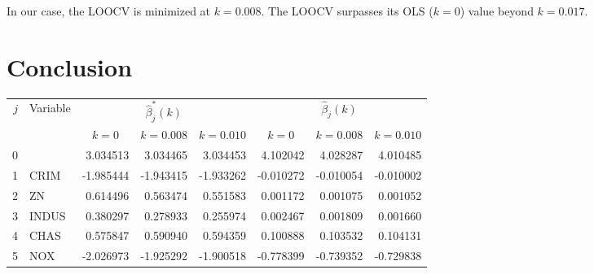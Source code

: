 \documentclass[10pt]{article}
\begin{document}
    In our case, the LOOCV is minimized at $k = 0.008$. The LOOCV surpasses its OLS
    ($k = 0$) value beyond $k = 0.017$.


    \section{Conclusion}


    \begin{table}[H]
    \centering
    \begin{tabular}{|r|l|r|r|r|r|r|r|} \hline
        \multirow{2}{*}{$j$}
            & \multirow{2}{*}{Variable}
                          & \multicolumn{3}{c|}{$\hat{\beta}^*_j(k)$}
                                                                      &
                                                                      \multicolumn{3}{c|}{$\hat{\beta}_j(k)$}
                                                                                                          \\\cline{3-8}
            &             & \multicolumn{1}{c|}{$k = 0$}
                                          & \multicolumn{1}{c|}{$k = 0.008$}
                                                          & \multicolumn{1}{c|}{$k = 0.010$}
                                                                      & \multicolumn{1}{c|}{$k = 0$}
                                                                                   & \multicolumn{1}{c|}{$k = 0.008$}
                                                                                               & \multicolumn{1}{c|}{$k = 0.010$}
                                                                                                          \\\hline
        0   &             & 3.034513      &  3.034465     & 3.034453  & 4.102042   & 4.028287  & 4.010485 \\
        1   & CRIM        &-1.985444      & -1.943415     &-1.933262  &-0.010272   &-0.010054  &-0.010002 \\
        2   & ZN          & 0.614496      &  0.563474     & 0.551583  & 0.001172   & 0.001075  & 0.001052 \\
        3   & INDUS       & 0.380297      &  0.278933     & 0.255974  & 0.002467   & 0.001809  & 0.001660 \\
        4   & CHAS        & 0.575847      &  0.590940     & 0.594359  & 0.100888   & 0.103532  & 0.104131 \\
        5   & NOX         &-2.026973      & -1.925292     &-1.900518  &-0.778399   &-0.739352  &-0.729838 \\

\end{tabular}
\end{table}
\end{document}
